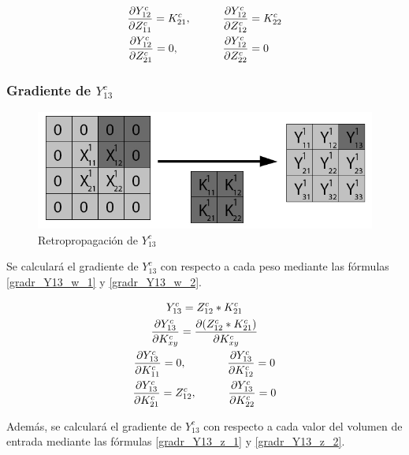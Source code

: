 \begin{gather}
	\frac{\partial Y^c_{12}}{\partial Z^c_{11}} = K^c_{21}, \hspace{10mm} \frac{\partial Y^c_{12}}{\partial Z^c_{12}} = K^c_{22} \label{gradr_Y12_z_1} \\
	\frac{\partial Y^c_{12}}{\partial Z^c_{21}} = 0, \hspace{14mm} \frac{\partial Y^c_{12}}{\partial Z^c_{22}} = 0 \hspace{4mm} \label{gradr_Y12_z_2}
\end{gather}

\subsubsection{Gradiente de $Y^c_{13}$}

\begin{figure}[H]
	\centering
	\includegraphics[width=0.8\linewidth]{imagenes/conv_back_padding_3.jpg} 
	\caption{Retropropagación de $Y^c_{13}$}
\end{figure}

Se calculará el gradiente de $Y^c_{13}$ con respecto a cada peso mediante las fórmulas \ref{gradr_Y13_w_1} y \ref{gradr_Y13_w_2}.

\begin{gather}
	Y^c_{13} = Z^c_{12} * K^c_{21} \\
	\frac{\partial Y^c_{13}}{\partial K^c_{xy}} = \frac{\partial (Z^c_{12} * K^c_{21})}{\partial K^c_{xy}} \\
	\frac{\partial Y^c_{13}}{\partial K^c_{11}} = 0, \hspace{13mm} \frac{\partial Y^c_{13}}{\partial K^c_{12}} = 0 \label{gradr_Y13_w_1} \\
	\frac{\partial Y^c_{13}}{\partial K^c_{21}} = Z^c_{12}, \hspace{10mm} \frac{\partial Y^c_{13}}{\partial K^c_{22}} = 0
\end{gather} \label{gradr_Y13_w_2}

Además, se calculará el gradiente de $Y^c_{13}$ con respecto a cada valor del volumen de entrada mediante las fórmulas \ref{gradr_Y13_z_1} y \ref{gradr_Y13_z_2}.

